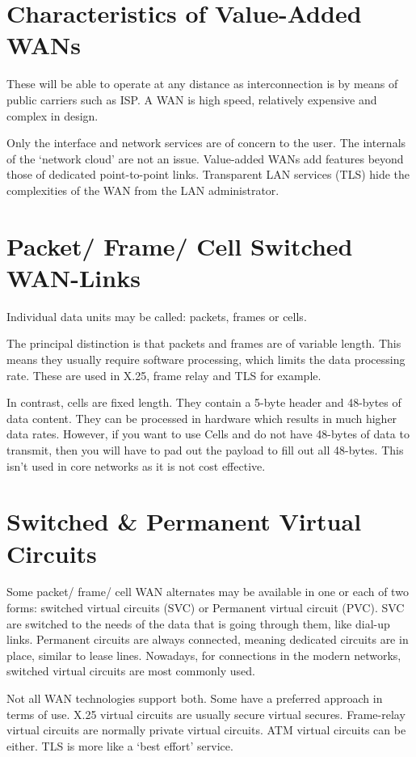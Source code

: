 
\section*{Characteristics of Value-Added WANs}
These will be able to operate at any distance as interconnection is by means of public carriers such as ISP. A WAN is high speed, relatively expensive and complex in design.

Only the interface and network services are of concern to the user. The internals of the `network cloud' are not an issue. Value-added WANs add features beyond those of dedicated point-to-point links. Transparent LAN services (TLS) hide the complexities of the WAN from the LAN administrator.

\section*{Packet/ Frame/ Cell Switched WAN-Links}
Individual data units may be called: packets, frames or cells.

The principal distinction is that packets and frames are of variable length. This means they usually require software processing, which limits the data processing rate. These are used in X.25, frame relay and TLS for example.

In contrast, cells are fixed length. They contain a 5-byte header and 48-bytes of data content. They can be processed in hardware which results in much higher data rates. However, if you want to use Cells and do not have 48-bytes of data to transmit, then you will have to pad out the payload to fill out all 48-bytes. This isn't used in core networks as it is not cost effective.

\section*{Switched \& Permanent Virtual Circuits}
Some packet/ frame/ cell WAN alternates may be available in  one or each of two forms: switched virtual circuits (SVC) or Permanent virtual circuit (PVC). SVC are switched to the needs of the data that is going through them, like dial-up  links. Permanent circuits are always connected, meaning dedicated circuits are in place, similar to lease lines. Nowadays, for connections in the modern networks, switched virtual circuits are most commonly used.

Not all WAN technologies support both. Some have a preferred approach in terms of use. X.25 virtual circuits are usually secure virtual secures. Frame-relay virtual circuits are normally private virtual circuits. ATM virtual circuits can be either. TLS is more like a `best effort' service.

